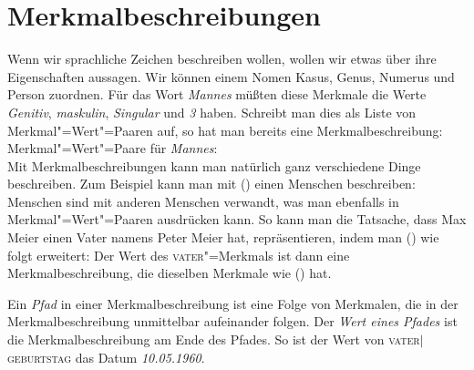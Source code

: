 \section{Merkmalbeschreibungen}

Wenn wir sprachliche Zeichen beschreiben wollen, wollen wir etwas über ihre Eigenschaften
aussagen. Wir können \zb einem Nomen Kasus, Genus, Numerus und Person zuordnen. Für das
Wort \emph{Mannes} müßten diese Merkmale die Werte \emph{Genitiv}, \emph{maskulin}, \emph{Singular} und \emph{3} haben.
Schreibt man dies als Liste von Merkmal"=Wert"=Paaren auf, so hat man bereits eine Merkmalbeschreibung:
\ea
Merkmal"=Wert"=Paare für \emph{Mannes}:\\
\z
Mit Merkmalbeschreibungen kann man natürlich ganz verschiedene Dinge beschreiben. Zum Beispiel kann
man mit () einen Menschen beschreiben:
\ea
{}
\z
Menschen sind mit anderen Menschen verwandt, was man ebenfalls in Merkmal"=Wert"=Paaren
ausdrücken kann. So kann man \zb die Tatsache, dass Max Meier einen Vater namens Peter
Meier hat, repräsentieren, indem man () wie folgt erweitert:
\ea
{}
\z
Der Wert des \textsc{vater}"=Merkmals ist dann eine Merkmalbeschreibung, die dieselben Merkmale
wie () hat.

Ein \emph{Pfad} in einer Merkmalbeschreibung ist eine Folge von Merkmalen, 
die in der Merkmalbeschreibung unmittelbar aufeinander folgen.
Der \emph{Wert eines Pfades} ist die Merkmalbeschreibung am Ende des Pfades. So ist
der Wert von \textsc{vater$|$geburtstag} das Datum \emph{10.05.1960}.

